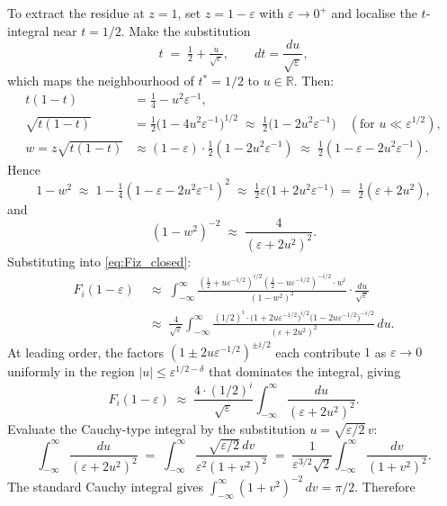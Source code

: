 \documentclass[12pt,a4paper]{article}
\theoremstyle{definition}
\newcommand{\R}{\mathbb{R}}
\begin{document}
To extract the residue at $z=1$, set $z=1-\varepsilon$ with
$\varepsilon\to 0^+$ and localise the $t$-integral near $t=1/2$.
Make the substitution
\[
t \;=\; \tfrac{1}{2} + \tfrac{u}{\sqrt{\varepsilon}}, \qquad
dt = \frac{du}{\sqrt{\varepsilon}},
\]
which maps the neighbourhood of $t^*=1/2$ to $u\in\R$.  Then:
\begin{align*}
t(1-t)
&= \tfrac{1}{4} - u^2\varepsilon^{-1},\\
\sqrt{t(1-t)}
&= \tfrac{1}{2}\bigl(1-4u^2\varepsilon^{-1}\bigr)^{1/2}
 \;\approx\; \tfrac{1}{2}\bigl(1 - 2u^2\varepsilon^{-1}\bigr)
  \quad(\text{for } u\ll\varepsilon^{1/2}),\\
w = z\sqrt{t(1-t)}
&\approx (1-\varepsilon)\cdot\tfrac{1}{2}(1-2u^2\varepsilon^{-1})
 \;\approx\; \tfrac{1}{2}(1-\varepsilon-2u^2\varepsilon^{-1}).
\end{align*}
Hence
\[
1-w^2 \;\approx\; 1 - \tfrac{1}{4}(1-\varepsilon-2u^2\varepsilon^{-1})^2
\;\approx\; \tfrac{1}{2}\varepsilon\bigl(1 + 2u^2\varepsilon^{-1}\bigr)
\;=\; \tfrac{1}{2}(\varepsilon + 2u^2),
\]
and
\[
(1-w^2)^{-2} \;\approx\; \frac{4}{(\varepsilon+2u^2)^2}.
\]
Substituting into \eqref{eq:Fiz_closed}:
\begin{align*}
F_i(1-\varepsilon)
&\;\approx\;
\int_{-\infty}^{\infty}
\frac{(\tfrac12+u\varepsilon^{-1/2})^{i/2}(\tfrac12-u\varepsilon^{-1/2})^{-i/2}
     \cdot w^i}
     {(1-w^2)^2}
\cdot\frac{du}{\sqrt\varepsilon}\\
&\;\approx\;
\frac{4}{\sqrt\varepsilon}
\int_{-\infty}^{\infty}
\frac{(1/2)^i\cdot\bigl(1+2u\varepsilon^{-1/2}\bigr)^{i/2}\bigl(1-2u\varepsilon^{-1/2}\bigr)^{-i/2}
     }{(\varepsilon+2u^2)^2}
\,du.
\end{align*}
At leading order, the factors $(1\pm 2u\varepsilon^{-1/2})^{\pm i/2}$
each contribute $1$ as $\varepsilon\to 0$ uniformly in the region
$|u|\le\varepsilon^{1/2-\delta}$ that dominates the integral, giving
\begin{equation}
\label{eq:residue_integral}
F_i(1-\varepsilon)
\;\approx\;
\frac{4\cdot(1/2)^i}{\sqrt\varepsilon}
\int_{-\infty}^{\infty}
\frac{du}{(\varepsilon+2u^2)^2}.
\end{equation}
Evaluate the Cauchy-type integral by the substitution $u=\sqrt{\varepsilon/2}\,v$:
\[
\int_{-\infty}^{\infty}\frac{du}{(\varepsilon+2u^2)^2}
\;=\;
\int_{-\infty}^{\infty}
\frac{\sqrt{\varepsilon/2}\,dv}{\varepsilon^2(1+v^2)^2}
\;=\;
\frac{1}{\varepsilon^{3/2}\sqrt2}
\int_{-\infty}^{\infty}\frac{dv}{(1+v^2)^2}.
\]
The standard Cauchy integral gives
$\int_{-\infty}^\infty(1+v^2)^{-2}\,dv=\pi/2$.  Therefore
\end{document}
